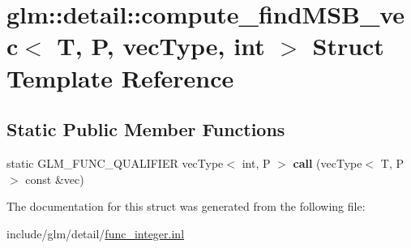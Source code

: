 \hypertarget{structglm_1_1detail_1_1compute__findMSB__vec}{}\section{glm\+:\+:detail\+:\+:compute\+\_\+find\+M\+S\+B\+\_\+vec$<$ T, P, vec\+Type, int $>$ Struct Template Reference}
\label{structglm_1_1detail_1_1compute__findMSB__vec}
\subsection*{Static Public Member Functions}
\begin{DoxyCompactItemize}
\item 
\mbox{\label{structglm_1_1detail_1_1compute__findMSB__vec_a9ea90d2230763f80ab30465fc3a73a65}} 
static G\+L\+M\+\_\+\+F\+U\+N\+C\+\_\+\+Q\+U\+A\+L\+I\+F\+I\+ER vec\+Type$<$ int, P $>$ {\bfseries call} (vec\+Type$<$ T, P $>$ const \&vec)
\end{DoxyCompactItemize}


The documentation for this struct was generated from the following file\+:\begin{DoxyCompactItemize}
\item 
include/glm/detail/\hyperlink{func__integer_8inl}{func\+\_\+integer.\+inl}\end{DoxyCompactItemize}
